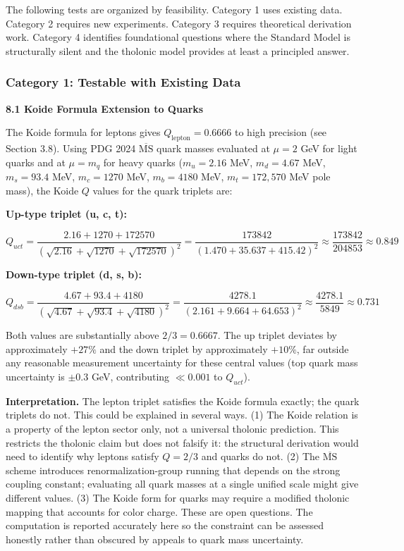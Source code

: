 \documentclass[12pt]{article}
\begin{document}
The following tests are organized by feasibility. Category 1 uses
existing data. Category 2 requires new experiments. Category 3 requires
theoretical derivation work. Category 4 identifies foundational
questions where the Standard Model is structurally silent and the
tholonic model provides at least a principled answer.

\subsubsection{Category 1: Testable with Existing
Data}\label{category-1-testable-with-existing-data}

\textbf{8.1 Koide Formula Extension to Quarks}

The Koide formula for leptons gives \(Q_\text{lepton} = 0.6666\) to high
precision (see Section 3.8). Using PDG 2024 \(\overline{\text{MS}}\)
quark masses evaluated at \(\mu = 2\) GeV for light quarks and at
\(\mu = m_q\) for heavy quarks (\(m_u = 2.16\) MeV, \(m_d = 4.67\) MeV,
\(m_s = 93.4\) MeV, \(m_c = 1270\) MeV, \(m_b = 4180\) MeV,
\(m_t = 172{,}570\) MeV pole mass), the Koide \(Q\) values for the quark
triplets are:

\textbf{Up-type triplet (u, c, t):}

\[Q_{uct} = \frac{2.16 + 1270 + 172570}{(\sqrt{2.16} + \sqrt{1270} + \sqrt{172570})^2} = \frac{173842}{(1.470 + 35.637 + 415.42)^2} \approx \frac{173842}{204853} \approx 0.849\]

\textbf{Down-type triplet (d, s, b):}

\[Q_{dsb} = \frac{4.67 + 93.4 + 4180}{(\sqrt{4.67} + \sqrt{93.4} + \sqrt{4180})^2} = \frac{4278.1}{(2.161 + 9.664 + 64.653)^2} \approx \frac{4278.1}{5849} \approx 0.731\]

Both values are substantially above \(2/3 = 0.6667\). The up triplet
deviates by approximately \(+27\%\) and the down triplet by
approximately \(+10\%\), far outside any reasonable measurement
uncertainty for these central values (top quark mass uncertainty is
\(\pm 0.3\) GeV, contributing \(\ll 0.001\) to \(Q_{uct}\)).

\textbf{Interpretation.} The lepton triplet satisfies the Koide formula
exactly; the quark triplets do not. This could be explained in several
ways. (1) The Koide relation is a property of the lepton sector only,
not a universal tholonic prediction. This restricts the tholonic claim
but does not falsify it: the structural derivation would need to
identify why leptons satisfy \(Q = 2/3\) and quarks do not. (2) The
\(\overline{\text{MS}}\) scheme introduces renormalization-group running
that depends on the strong coupling constant; evaluating all quark
masses at a single unified scale might give different values. (3) The
Koide form for quarks may require a modified tholonic mapping that
accounts for color charge. These are open questions. The computation is
reported accurately here so the constraint can be assessed honestly
rather than obscured by appeals to quark mass uncertainty.
\end{document}
